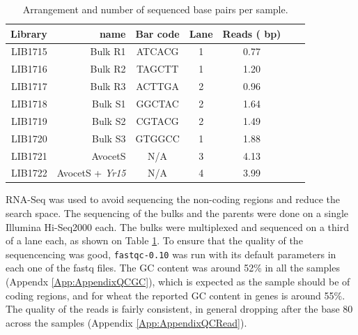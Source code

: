 \begin{table}
\centering
\caption{Arrangement and number of sequenced base pairs per sample. }
\label{tab:yr15:reads}
\begin{tabular}{rrccccc}
\toprule
Library & name & Bar code & Lane   &  Reads (\e{8} bp)\\ 
\midrule
LIB1715 & Bulk R1 & ATCACG & 1 	& 0.77\\
LIB1716 & Bulk R2 & TAGCTT & 1 		& 1.20\\
LIB1717 & Bulk R3 & ACTTGA & 2 	& 0.96  \\ 
LIB1718 & Bulk S1 & GGCTAC & 2 	& 1.64   \\ 
LIB1719 & Bulk S2 & CGTACG & 2 	& 1.49  \\ 
LIB1720 & Bulk S3 & GTGGCC & 1 	&1.88  \\ 
LIB1721 & AvocetS & N/A & 3 		& 4.13 \\ 
LIB1722 & AvocetS + \textit{Yr15} & N/A & 4 	& 3.99  \\ 
\bottomrule
\end{tabular}
\end{table}

RNA-Seq was used to avoid sequencing the non-coding regions and reduce the search space.  
The sequencing of the bulks and the parents were done on a single Illumina Hi-Seq2000 each.
The bulks were multiplexed and sequenced on a third of a lane each, as shown on Table \ref{tab:yr15:reads}. 
To ensure that the quality of the sequencencing was good, \verb|fastqc-0.10| \citep{fastqc}  was run with its default parameters in each one of the fastq files.  
The GC content was around 52\% in all the samples (Appendx \ref{App:AppendixQCGC}), which is expected as the sample should be of coding regions, and for wheat the reported GC content in genes is around 55\%.  
The quality of the reads is fairly consistent, in general dropping after the base 80 across the samples (Appendix \ref{App:AppendixQCRead}). 




